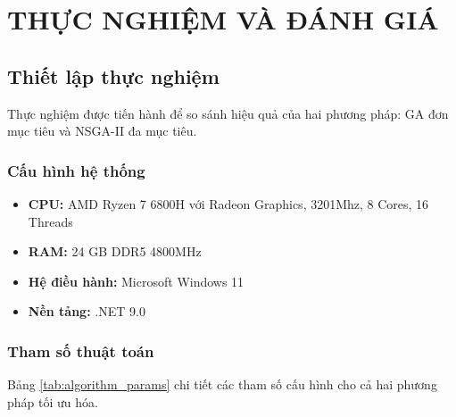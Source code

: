 \clearpage
{}
\chapter{THỰC NGHIỆM VÀ ĐÁNH GIÁ}

\section{Thiết lập thực nghiệm}
Thực nghiệm được tiến hành để so sánh hiệu quả của hai phương pháp: GA đơn mục tiêu và NSGA-II đa mục tiêu.

\subsection{Cấu hình hệ thống}
\begin{itemize}
    \item \textbf{CPU:} AMD Ryzen 7 6800H với Radeon Graphics, 3201Mhz, 8 Cores, 16 Threads
    \item \textbf{RAM:} 24 GB DDR5 4800MHz
    \item \textbf{Hệ điều hành:} Microsoft Windows 11
    \item \textbf{Nền tảng:} .NET 9.0
\end{itemize}

\subsection{Tham số thuật toán}
Bảng \ref{tab:algorithm_params} chi tiết các tham số cấu hình cho cả hai phương pháp tối ưu hóa.

